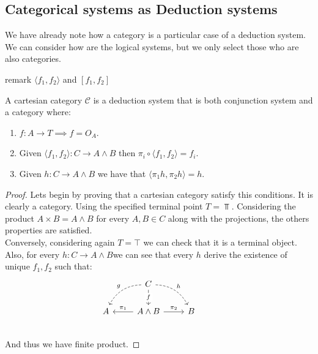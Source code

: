 \subsection{Categorical systems as Deduction systems}

We have already note how a category is a particular case of a deduction system. We can consider how are the logical systems, but we only select those who are also categories.\\

\begin{remark} {\color{red} remark $\langle f_1,f_2\rangle$ and $[f_1,f_2]$}
  
\end{remark}


\begin{proposition}
  A cartesian category $\mathcal{C}$ is a deduction system that is both conjunction system and a category where:
  \begin{enumerate}
  \item $f:A\to T\implies f=O_A$.
  \item Given $\langle f_1,f_2\rangle: C\to A\land B$ then $\pi_i \circ \langle f_1,f_2\rangle = f_i$.
  \item Given $h:C\to A\land B$ we have that $\langle \pi_1 h, \pi_2 h\rangle = h$.
  \end{enumerate}
\end{proposition}

\begin{proof}

  Lets begin by proving that a cartesian category satisfy this conditions. It is clearly a category. Using the specified terminal point $T=\Top$.  Considering the product $A\times B = A\land B$ for every $A,B \in C$ along with the projections, the others properties are satisfied.\\

  Conversely, considering again $T= \top$ we can check that it is a terminal object. Also, for every $h:C\to A\land B$we can see that every $h$ derive the existence of unique $f_1,f_2$ such that:
  \[
    \begin{tikzcd}
      {} & C \arrow[bend right,swap,dashed]{dl}{g}
      \arrow[bend left,dashed]{dr}{h} \arrow{d}[description]{f}& & \\
      A  &A\land B \arrow{l}[swap]{\pi_1} \arrow{r}{\pi_2} & 
      B \\
    \end{tikzcd}
  \]
  And thus we have finite product.
\end{proof}

